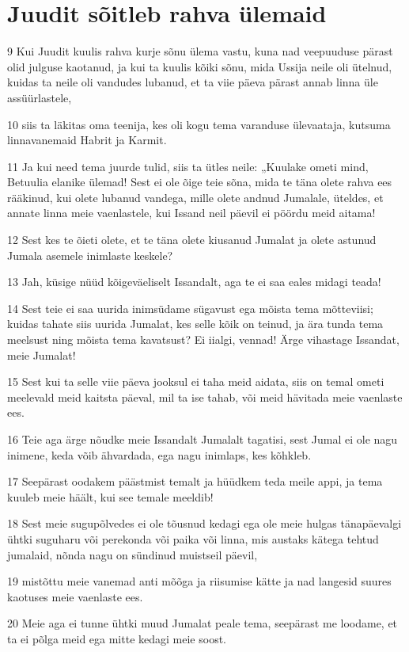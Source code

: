\section*{Juudit sõitleb rahva ülemaid}

\par 9 Kui Juudit kuulis rahva kurje sõnu ülema vastu, kuna nad veepuuduse pärast olid julguse kaotanud, ja kui ta kuulis kõiki sõnu, mida Ussija neile oli ütelnud, kuidas ta neile oli vandudes lubanud, et ta viie päeva pärast annab linna üle assüürlastele,
\par 10 siis ta läkitas oma teenija, kes oli kogu tema varanduse ülevaataja, kutsuma linnavanemaid Habrit ja Karmit.
\par 11 Ja kui need tema juurde tulid, siis ta ütles neile: „Kuulake ometi mind, Betuulia elanike ülemad! Sest ei ole õige teie sõna, mida te täna olete rahva ees rääkinud, kui olete lubanud vandega, mille olete andnud Jumalale, üteldes, et annate linna meie vaenlastele, kui Issand neil päevil ei pöördu meid aitama!
\par 12 Sest kes te õieti olete, et te täna olete kiusanud Jumalat ja olete astunud Jumala asemele inimlaste keskele?
\par 13 Jah, küsige nüüd kõigeväeliselt Issandalt, aga te ei saa eales midagi teada!
\par 14 Sest teie ei saa uurida inimsüdame sügavust ega mõista tema mõtteviisi; kuidas tahate siis uurida Jumalat, kes selle kõik on teinud, ja ära tunda tema meelsust ning mõista tema kavatsust? Ei iialgi, vennad! Ärge vihastage Issandat, meie Jumalat!
\par 15 Sest kui ta selle viie päeva jooksul ei taha meid aidata, siis on temal ometi meelevald meid kaitsta päeval, mil ta ise tahab, või meid hävitada meie vaenlaste ees.
\par 16 Teie aga ärge nõudke meie Issandalt Jumalalt tagatisi, sest Jumal ei ole nagu inimene, keda võib ähvardada, ega nagu inimlaps, kes kõhkleb.
\par 17 Seepärast oodakem päästmist temalt ja hüüdkem teda meile appi, ja tema kuuleb meie häält, kui see temale meeldib!
\par 18 Sest meie sugupõlvedes ei ole tõusnud kedagi ega ole meie hulgas tänapäevalgi ühtki suguharu või perekonda või paika või linna, mis austaks kätega tehtud jumalaid, nõnda nagu on sündinud muistseil päevil,
\par 19 mistõttu meie vanemad anti mõõga ja riisumise kätte ja nad langesid suures kaotuses meie vaenlaste ees.
\par 20 Meie aga ei tunne ühtki muud Jumalat peale tema, seepärast me loodame, et ta ei põlga meid ega mitte kedagi meie soost.
